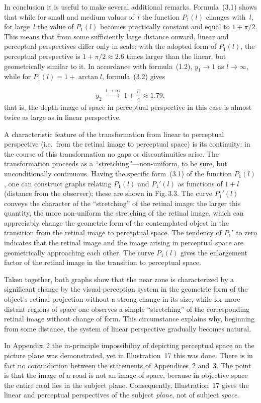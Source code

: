 In conclusion it is useful to make several additional remarks.  Formula~(3.1) shows that
while for small and medium values of~$l$ the function $P_1(l)$ changes with~$l$, for
large~$l$ the value of $P_1(l)$ becomes practically constant and equal to $1 + \pi/2$.
This means that from some sufficiently large distance onward, linear and perceptual
perspectives differ only in scale: with the adopted form of $P_1(l)$, the perceptual
perspective is $1 + \pi/2 \approx 2.6$ times larger than the linear, but geometrically
similar to it.  In accordance with formula~(1.2), $y_1 \to 1$ as $l \to \infty$, while
for $P_1(l) = 1 + \arctan l$, formula~(3.2) gives

\[
  y_2 \;\xrightarrow{l\to\infty}\; 1 + \frac{\pi}{4} \approx 1.79,
\]
that is, the depth-image of space in perceptual perspective in this case is almost twice as
large as in linear perspective.

A characteristic feature of the transformation from linear to perceptual perspective (i.e.\
from the retinal image to perceptual space) is its continuity: in the course of this
transformation no gaps or discontinuities arise.  The transformation proceeds as a
``stretching''---non-uniform, to be sure, but unconditionally continuous.  Having the
specific form~(3.1) of the function $P_1(l)$, one can construct graphs relating $P_1(l)$
and $P_1'(l)$ as functions of $1 + l$ (distance from the observer); these are shown in
Fig.\,3.3.  The curve $P_1'(l)$ conveys the character of the ``stretching'' of the retinal
image: the larger this quantity, the more non-uniform the stretching of the retinal image,
which can appreciably change the geometric form of the contemplated object in the
transition from the retinal image to perceptual space.  The tendency of $P_1'$ to zero
indicates that the retinal image and the image arising in perceptual space are
geometrically approaching each other.  The curve $P_1(l)$ gives the enlargement factor of
the retinal image in the transition to perceptual space.

Taken together, both graphs show that the near zone is characterized by a significant
change by the visual-perception system in the geometric form of the object's retinal
projection without a strong change in its size, while for more distant regions of space one
observes a simple ``stretching'' of the corresponding retinal image without change of form.
This circumstance explains why, beginning from some distance, the system of linear
perspective gradually becomes natural.

In Appendix~2 the in-principle impossibility of depicting perceptual space on the picture
plane was demonstrated, yet in Illustration~17 this was done.  There is in fact no
contradiction between the statements of Appendices~2 and~3.  The point is that the image
of a road is not an image of space, because in objective space the entire road lies in the
subject plane.  Consequently, Illustration~17 gives the linear and perceptual perspectives
of the subject \emph{plane}, not of subject \emph{space}.
